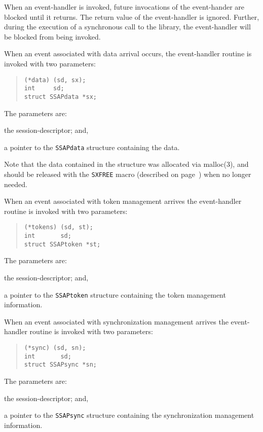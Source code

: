When an event-handler is invoked,
future invocations of the event-hander are blocked until it returns.
The return value of the event-handler is ignored.
Further,
during the execution of a synchronous call to the library,
the event-handler will be blocked from being invoked.

When an event associated with data arrival occurs,
the event-handler routine is invoked with two parameters:
\begin{quote}\small\begin{verbatim}
(*data) (sd, sx);
int     sd;
struct SSAPdata *sx;
\end{verbatim}\end{quote}
The parameters are:
\begin{describe}
\item[\verb"sd":] the session-descriptor;
and,

\item[\verb"sx":] a pointer to the \verb"SSAPdata" structure containing
the data.
\end{describe}
Note that the data contained in the structure was allocated via \man malloc(3),
and should be released with the \verb"SXFREE" macro
(described on page~\pageref{SXFREE}) when no longer needed.

When an event associated with token management arrives
the event-handler routine is invoked with two parameters:
\begin{quote}\small\begin{verbatim}
(*tokens) (sd, st);
int       sd;
struct SSAPtoken *st;
\end{verbatim}\end{quote}
The parameters are:
\begin{describe}
\item[\verb"sd":] the session-descriptor;
and,

\item[\verb"st":] a pointer to the \verb"SSAPtoken" structure containing
the token management information.
\end{describe}

When an event associated with synchronization management arrives
the event-handler routine is invoked with two parameters:
\begin{quote}\small\begin{verbatim}
(*sync) (sd, sn);
int       sd;
struct SSAPsync *sn;
\end{verbatim}\end{quote}
The parameters are:
\begin{describe}
\item[\verb"sd":] the session-descriptor;
and,

\item[\verb"sn":] a pointer to the \verb"SSAPsync" structure containing
the synchronization management information.
\end{describe}

